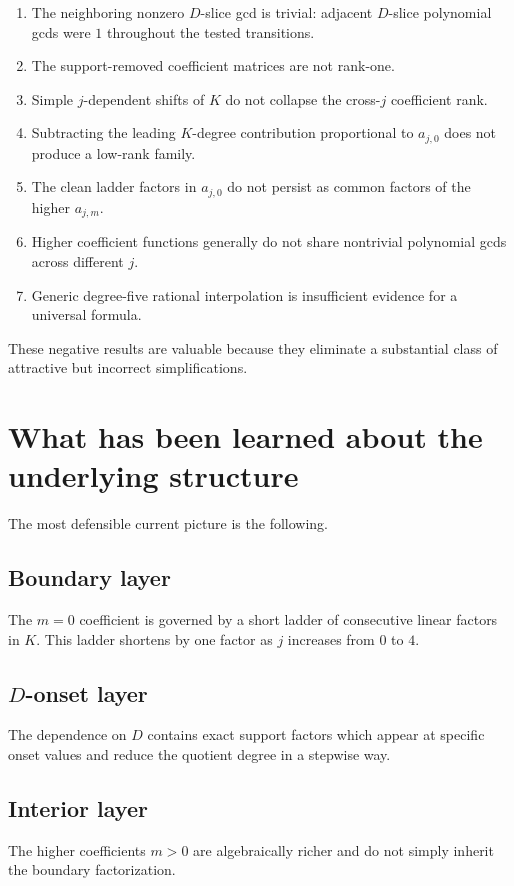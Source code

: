 \documentclass[11pt,a4paper]{article}
\begin{document}
\begin{enumerate}[leftmargin=2em]
\item The neighboring nonzero $D$-slice gcd is trivial: adjacent $D$-slice polynomial gcds were $1$ throughout the tested transitions.
\item The support-removed coefficient matrices are not rank-one.
\item Simple $j$-dependent shifts of $K$ do not collapse the cross-$j$ coefficient rank.
\item Subtracting the leading $K$-degree contribution proportional to $a_{j,0}$ does not produce a low-rank family.
\item The clean ladder factors in $a_{j,0}$ do not persist as common factors of the higher $a_{j,m}$.
\item Higher coefficient functions generally do not share nontrivial polynomial gcds across different $j$.
\item Generic degree-five rational interpolation is insufficient evidence for a universal formula.
\end{enumerate}

These negative results are valuable because they eliminate a substantial class of attractive but incorrect simplifications.

\section{What has been learned about the underlying structure}

The most defensible current picture is the following.

\subsection*{Boundary layer}
The $m=0$ coefficient is governed by a short ladder of consecutive linear factors in $K$. This ladder shortens by one factor as $j$ increases from $0$ to $4$.

\subsection*{$D$-onset layer}
The dependence on $D$ contains exact support factors which appear at specific onset values and reduce the quotient degree in a stepwise way.

\subsection*{Interior layer}
The higher coefficients $m>0$ are algebraically richer and do not simply inherit the boundary factorization.
\end{document}

